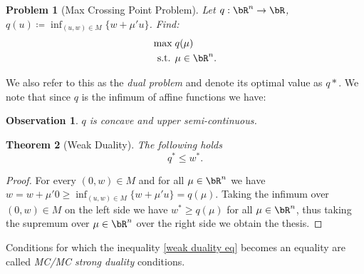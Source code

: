 \documentclass[11pt,a4paper,oneside,openany]{book}
\newtheorem{theorem}{Theorem}
\newtheorem{observation}[theorem]{Observation}
\newtheorem{problem}{Problem}
\numberwithin{definition}{section}
\numberwithin{theorem}{section}
\numberwithin{problem}{section}
\begin{document}
\begin{problem}[Max Crossing Point Problem]\label{max crossing problem}
Let $q:\bR^n \to \bR$, $q(u) \coloneqq \inf_{(u,w) \in M}\{w + \mu' u\}$. Find:
    \begin{align}
        \max \;& q(\mu) \\
        \text{s.t. }& \mu \in \bR^n.
    \end{align}
\end{problem}

We also refer to this as the \emph{dual problem} and denote its optimal value as $q*$. We note that since $q$ is the infimum of affine functions we have:

\begin{observation}
    $q$ is concave and upper semi-continuous.
\end{observation}
    

\begin{theorem}[Weak Duality] The following holds
    \begin{equation} \label{weak duality eq}
        q^* \leq w^*.
    \end{equation}
\end{theorem}
\begin{proof}
    For every $(0,w) \in M$ and for all $\mu \in \bR^n$ we have $w = w +\mu'0 \geq \inf_{(u,w) \in M}\{w + \mu' u\} = q(\mu)$. Taking the infimum over $(0,w) \in M$ on the left side we have $w^* \geq q(\mu) $ for all $\mu \in \bR^n$, thus taking the supremum over $\mu \in \bR^n$ over the right side we obtain the thesis.
\end{proof}

Conditions for which the inequality \eqref{weak duality eq} becomes an equality are called \emph{MC/MC strong duality} conditions.
\end{document}

